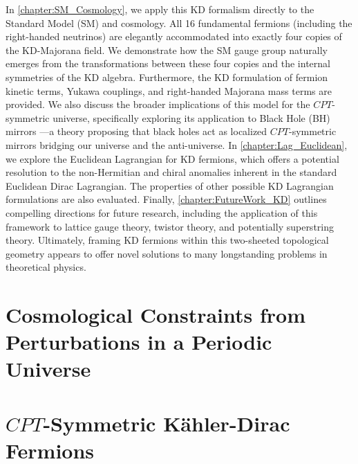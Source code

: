 \documentclass[12pt,a4paper]{report}
\let\cite\parencite
\begin{document}
In \cref{chapter:SM_Cosmology}, we apply this KD formalism directly to the Standard Model (SM) and cosmology. All 16 fundamental fermions (including the right-handed neutrinos) are elegantly accommodated into exactly four copies of the KD-Majorana field. We demonstrate how the SM gauge group naturally emerges from the transformations between these four copies and the internal symmetries of the KD algebra. Furthermore, the KD formulation of fermion kinetic terms, Yukawa couplings, and right-handed Majorana mass terms are provided. We also discuss the broader implications of this model for the $CPT$-symmetric universe, specifically exploring its application to Black Hole (BH) mirrors \cite{tzanavaris2025blackmirrorscptsymmetricalternatives}---a theory proposing that black holes act as localized $CPT$-symmetric mirrors bridging our universe and the anti-universe. In \cref{chapter:Lag_Euclidean}, we explore the Euclidean Lagrangian for KD fermions, which offers a potential resolution to the non-Hermitian and chiral anomalies inherent in the standard Euclidean Dirac Lagrangian. The properties of other possible KD Lagrangian formulations are also evaluated. Finally, \cref{chapter:FutureWork_KD} outlines compelling directions for future research, including the application of this framework to lattice gauge theory, twistor theory, and potentially superstring theory. Ultimately, framing KD fermions within this two-sheeted topological geometry appears to offer novel solutions to many longstanding problems in theoretical physics.

\printbibliography[heading=subbibliography,title={References}]

\part{Cosmological Constraints from Perturbations in a Periodic Universe} \label{part:constraint_perturb}







\part{$CPT$-Symmetric K\"{a}hler-Dirac Fermions} \label{part:KD-fermions}






\end{document}

